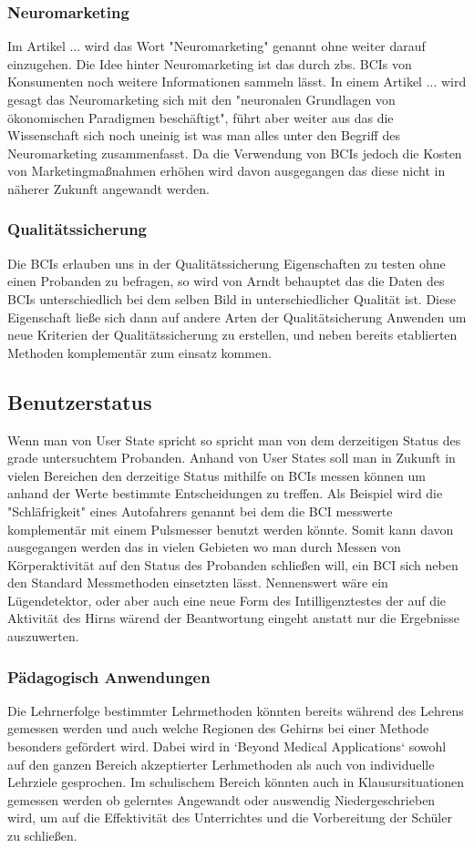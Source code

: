 \documentclass[11pt]{article} %
\begin{document}
\subsubsection{Neuromarketing}
Im Artikel ... wird das Wort "Neuromarketing" genannt ohne weiter darauf einzugehen. Die Idee hinter Neuromarketing ist das durch zbs. BCIs von Konsumenten noch weitere Informationen sammeln lässt.  In einem Artikel ... wird gesagt das Neuromarketing sich mit den "neuronalen Grundlagen
von ökonomischen Paradigmen beschäftigt", führt aber weiter aus das die Wissenschaft sich noch uneinig ist was man alles unter den Begriff des Neuromarketing zusammenfasst. Da die Verwendung von BCIs jedoch die Kosten von Marketingmaßnahmen erhöhen wird davon ausgegangen das diese nicht in näherer Zukunft angewandt werden. 
\subsubsection{Qualitätssicherung}
Die BCIs erlauben uns in der Qualitätssicherung Eigenschaften zu testen ohne einen Probanden zu befragen, so wird von Arndt behauptet das die Daten des BCIs unterschiedlich bei dem selben Bild in unterschiedlicher Qualität ist. Diese Eigenschaft ließe sich dann auf andere Arten der Qualitätsicherung Anwenden um neue Kriterien der Qualitätssicherung zu erstellen, und neben bereits etablierten Methoden komplementär zum einsatz kommen.   
\subsection{Benutzerstatus}
Wenn man von User State spricht so spricht man von dem derzeitigen Status des grade untersuchtem Probanden. Anhand von User States soll man in Zukunft in vielen Bereichen den derzeitige Status mithilfe on BCIs messen können um anhand der Werte bestimmte Entscheidungen zu treffen. Als Beispiel wird die "Schläfrigkeit" eines Autofahrers genannt bei dem die BCI messwerte komplementär mit einem Pulsmesser benutzt werden könnte. Somit kann davon ausgegangen werden das in vielen Gebieten wo man durch Messen von Körperaktivität auf den Status des Probanden schließen will, ein BCI sich neben den Standard Messmethoden einsetzten lässt. Nennenswert wäre ein Lügendetektor, oder aber auch eine neue Form des Intilligenztestes der auf die Aktivität des Hirns wärend der Beantwortung eingeht anstatt nur die Ergebnisse auszuwerten.
\subsubsection{Pädagogisch Anwendungen}
Die Lehrnerfolge bestimmter Lehrmethoden könnten bereits während des Lehrens gemessen werden und auch welche Regionen des Gehirns bei einer Methode besonders gefördert wird. Dabei wird in `Beyond Medical Applications` sowohl auf den ganzen Bereich akzeptierter Lerhmethoden als auch von individuelle Lehrziele gesprochen.
Im schulischem Bereich könnten auch in Klausursituationen gemessen werden ob gelerntes Angewandt oder auswendig Niedergeschrieben wird, um auf die Effektivität des Unterrichtes und die Vorbereitung der Schüler zu schließen.
\end{document}
